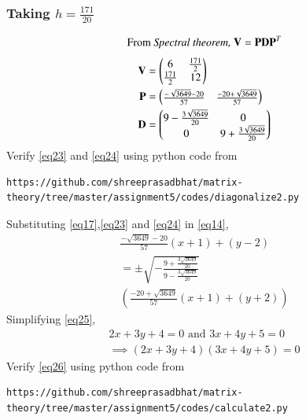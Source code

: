\documentclass[journal,12pt,twocolumn]{IEEEtran}
\begin{document}
\subsubsection{Taking $h=\frac{171}{20}$}
\begin{equation}
	\text{From \textit{Spectral theorem, }} \vec{V} = \vec{P}\vec{D}\vec{P}^T
\end{equation}
\begin{align}
	\vec{V} &= \myvec{ 6 & \frac{171}{2}\\ \frac{171}{2} & 12}\\
	\label{eq23}\vec{P} &= \myvec{\frac{-\sqrt{3649} - 20}{57} & \frac{-20 + \sqrt{3649}}{57}}\\
	\label{eq24}\vec{D} &= \myvec{9 - \frac{3\sqrt{3649}}{20} & 0\\ 0 & 9 + \frac{3\sqrt{3649}}{20}}
\end{align}
Verify  \eqref{eq23} and \eqref{eq24} using python code from
\begin{lstlisting}
https://github.com/shreeprasadbhat/matrix-theory/tree/master/assignment5/codes/diagonalize2.py
\end{lstlisting}
Substituting \eqref{eq17},\eqref{eq23} and \eqref{eq24} in \eqref{eq14}, 
\begin{multline}\label{eq25}
	\frac{-\sqrt{3649} - 20}{57}(x+1) + (y-2) \\= \pm 
	\sqrt{-\frac{9 + \frac{3\sqrt{3649}}{20}}{9 - \frac{3\sqrt{3649}}{20}}}\\
	\left(\frac{-20 + \sqrt{3649}}{57}(x+1) + (y+2)\right)
\end{multline}
Simplifying \eqref{eq25},
\begin{align}
	\label{eq26}2x + 3y + 4 = 0 \text{ and } 3x + 4y + 5 = 0\\
	\label{eq27}\implies (2x + 3y + 4)(3x + 4y + 5) = 0
\end{align}
Verify  \eqref{eq26} using python code from
\begin{lstlisting}
https://github.com/shreeprasadbhat/matrix-theory/tree/master/assignment5/codes/calculate2.py
\end{lstlisting}
\renewcommand{\thefigure}{2}
\end{document}
